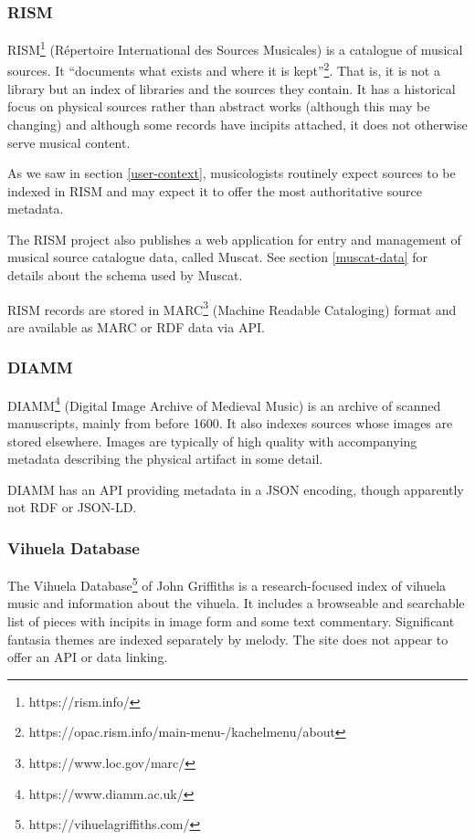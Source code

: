 \documentclass[9pt,twocolumn]{extarticle}
\begin{document}
\begin{sloppypar}
  \subsubsection{RISM}

  RISM\footnote{https://rism.info/} (R\'epertoire International des
  Sources Musicales) is a catalogue of musical sources. It ``documents
  what exists and where it is
  kept''\footnote{https://opac.rism.info/main-menu-/kachelmenu/about}. That
  is, it is not a library but an index of libraries and the sources
  they contain. It has a historical focus on physical sources rather
  than abstract works (although this may be changing) and although
  some records have incipits attached, it does not otherwise serve
  musical content.

  As we saw in section \ref{user-context}, musicologists routinely
  expect sources to be indexed in RISM and may expect it to offer the
  most authoritative source metadata.

  The RISM project also publishes a web application for entry and
  management of musical source catalogue data, called Muscat. See
  section \ref{muscat-data} for details about the schema used by
  Muscat.

  RISM records are stored in MARC\footnote{https://www.loc.gov/marc/}
  (Machine Readable Cataloging) format and are available as MARC or
  RDF data via API.

  \subsubsection{DIAMM}

  DIAMM\footnote{https://www.diamm.ac.uk/} (Digital Image Archive of
  Medieval Music) is an archive of scanned manuscripts, mainly from
  before 1600. It also indexes sources whose images are stored
  elsewhere. Images are typically of high quality with accompanying
  metadata describing the physical artifact in some detail.

  DIAMM has an API providing metadata in a JSON encoding, though
  apparently not RDF or JSON-LD.
  
  \subsubsection{Vihuela Database}

  The Vihuela Database\footnote{https://vihuelagriffiths.com/} of John
  Griffiths is a research-focused index of vihuela music and
  information about the vihuela. It includes a browseable and
  searchable list of pieces with incipits in image form and some text
  commentary. Significant fantasia themes are indexed separately by
  melody. The site does not appear to offer an API or data linking.


\end{sloppypar}
\end{document}
